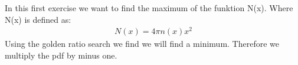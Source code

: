 In this first exercise we want to find the maximum of the funktion N(x). Where N(x) is defined as:
\begin{align}
    N(x) = 4 \pi n(x) x^2
\end{align} 
Using the golden ratio search we find we will find a minimum. Therefore we multiply the pdf by minus one. 



